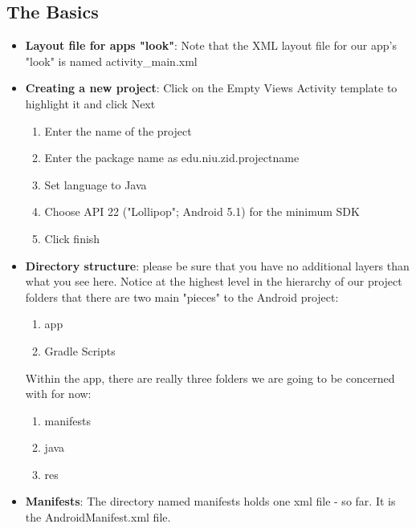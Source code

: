 \documentclass{report}
\begin{document}
    \pagebreak 
    \bigbreak \noindent 
    \subsection{The Basics}
    \begin{itemize}
        \item \textbf{Layout file for apps "look"}: Note that the XML layout file for our app's "look" is named activity\_main.xml
        \item \textbf{Creating a new project}: Click on the Empty Views Activity template to highlight it and click Next
            \begin{enumerate}
                \item Enter the name of the project
                \item Enter the package name as edu.niu.zid.projectname
                \item Set language to Java
                \item Choose API 22 ("Lollipop"; Android 5.1) for the minimum SDK
                \item Click finish
            \end{enumerate}
        \item \textbf{Directory structure}: please be sure that you have no additional layers than what you see here.
            \bigbreak \noindent 
            \bigbreak \noindent 
            Notice at the highest level in the hierarchy of our project folders that there are two main "pieces" to the Android project:
            \begin{enumerate}
                \item app
                \item Gradle Scripts
            \end{enumerate}
            \bigbreak \noindent 
            Within the app, there are really three folders we are going to be concerned with for now:
            \begin{enumerate}
                \item manifests
                \item java
                \item res
            \end{enumerate}
        \item \textbf{Manifests}: The directory named manifests holds one xml file - so far. It is the AndroidManifest.xml file.

\end{itemize}
\end{document}
